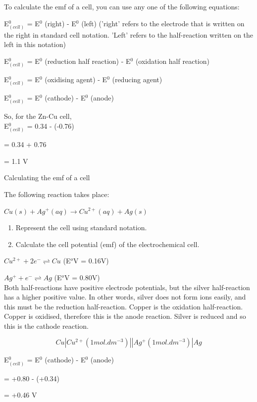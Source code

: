 To calculate the emf of a cell, you can use any one of the following equations:

E$^{0}_{(cell)}$ = E$^{0}$ (right) - E$^{0}$ (left) ('right' refers to the electrode that is written on the right in standard cell notation. 'Left' refers to the half-reaction written on the left in this notation) 

E$^{0}_{(cell)}$ = E$^{0}$ (reduction half reaction) - E$^{0}$ (oxidation half reaction)

E$^{0}_{(cell)}$ = E$^{0}$ (oxidising agent) - E$^{0}$ (reducing agent)

E$^{0}_{(cell)}$ = E$^{0}$ (cathode) - E$^{0}$ (anode)


So, for the Zn-Cu cell, \\

E$^{0}_{(cell)}$ = 0.34 - (-0.76)

= 0.34 + 0.76

= 1.1 V


\begin{wex}{Calculating the emf of a cell}{The following reaction takes place:

\begin{center}
\rm${Cu(s) + Ag^{+}(aq) \rightarrow Cu^{2+}(aq) + Ag(s)}$
\end{center}

\begin{enumerate}
\item{Represent the cell using standard notation.}
\item{Calculate the cell potential (emf) of the electrochemical cell.\\}
\end{enumerate}
}
{
\rm${Cu^{2+} + 2e^{-} \rightleftharpoons Cu}$ (E$^{o}$V = 0.16V)

\rm${Ag^{+} + e^{-} \rightleftharpoons Ag}$ (E$^{o}$V = 0.80V)\\

Both half-reactions have positive electrode potentials, but the silver half-reaction has a higher positive value. In other words, silver does not form ions easily, and this must be the reduction half-reaction. Copper is the oxidation half-reaction. Copper is oxidised, therefore this is the anode reaction. Silver is reduced and so this is the cathode reaction.

\begin{equation*}
Cu|Cu^{2+} (1 mol.dm^{-3})||Ag^{+} (1 mol.dm^{-3})|Ag
\end{equation*}

E$^{0}_{(cell)}$ = E$^{0}$ (cathode) - E$^{0}$ (anode)

= +0.80 - (+0.34)

= +0.46 V\\
}
\end{wex}

